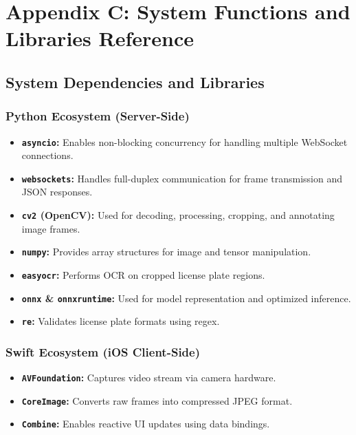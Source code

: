\documentclass[11pt]{report}
\begin{document}
\chapter{Appendix C: System Functions and Libraries Reference}

\section{System Dependencies and Libraries}

\subsection{Python Ecosystem (Server-Side)}
\begin{itemize}
    \item \textbf{\texttt{asyncio}:} Enables non-blocking concurrency for handling multiple WebSocket connections.
    \item \textbf{\texttt{websockets}:} Handles full-duplex communication for frame transmission and JSON responses.
    \item \textbf{\texttt{cv2} (OpenCV):} Used for decoding, processing, cropping, and annotating image frames.
    \item \textbf{\texttt{numpy}:} Provides array structures for image and tensor manipulation.
    \item \textbf{\texttt{easyocr}:} Performs OCR on cropped license plate regions.
    \item \textbf{\texttt{onnx} \& \texttt{onnxruntime}:} Used for model representation and optimized inference.
    \item \textbf{\texttt{re}:} Validates license plate formats using regex.
\end{itemize}

\subsection{Swift Ecosystem (iOS Client-Side)}
\begin{itemize}
    \item \textbf{\texttt{AVFoundation}:} Captures video stream via camera hardware.
    \item \textbf{\texttt{CoreImage}:} Converts raw frames into compressed JPEG format.
    \item \textbf{\texttt{Combine}:} Enables reactive UI updates using data bindings.
\end{itemize}

\clearpage
\end{document}
